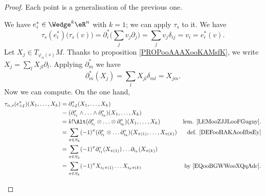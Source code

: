 \begin{proof}
	Each point is a generalisation of the previous one.
	\begin{subproof}
		We have \( e^*_i\in \Wedge^k\eR^n\) with \( k=1\); we can apply \( \tau_s\) to it. We have
		\begin{equation}
			\tau_s(e^*_i)\big( \tau_s(v) \big)=\partial_i^*\big( \sum_jv_j\partial_j \big)=\sum_jv_j\delta_{ij}=v_i=e^*_i(v).
		\end{equation}
		Let \( X_j\in T_{\varphi_{\alpha}(s)}M\). Thanks to proposition \ref{PROPooAAAXooKAMsfK}, we write \( X_j=\sum_lX_{jl}\partial_l\). Applying \( \partial^*_m\) we have
		\begin{equation}		\label{EQooBGWWooXQqAdc}
			\partial_m^*(X_j)=\sum_lX_{jl}\delta_{ml}=X_{jm}.
		\end{equation}
		Now we can compute. On the one hand,
		\begin{subequations}
			\begin{align}
				\tau_{\alpha,s}(e^*_{\wedge I})(X_1,\ldots,X_k) & = \partial^*_{\wedge I}(X_1,\ldots,X_k)                                                                                                              \\
				                                                & =(\partial_{i_1}^*\wedge \ldots \wedge \partial_{i_k}^*)(X_1,\ldots,X_k)                                                                             \\
				                                                & =k!\Alt(\partial^*_{i_1}\otimes \ldots\otimes \partial_{i_k}^*)(X_1,\ldots,X_k)                               & \text{lem. \ref{LEMooZJJLooFGuguy}.} \\
				                                                & = \sum_{\pi\in S_k}(-1)^{\pi}(\partial_{i_1}^*\otimes \ldots \partial_{i_k}^*)(X_{\pi(1)},\ldots, X_{\pi(k)}) & \text{def. \ref{DEFooHAKAooIfbsEy}}  \\
				                                                & = \sum_{\pi\in S_k}(-1)^{\pi} \partial_{i_1}^*(X_{\pi(1)})\ldots \partial_{i_k}(X_{\pi(k)})                                                          \\
				                                                & = \sum_{\pi\in S_k}(-1)^{\pi}X_{i_1\pi(1)}\ldots X_{i_k\pi(k)}                                                & \text{by \eqref{EQooBGWWooXQqAdc}.}

\end{align}
\end{subequations}
\end{subproof}
\end{proof}
